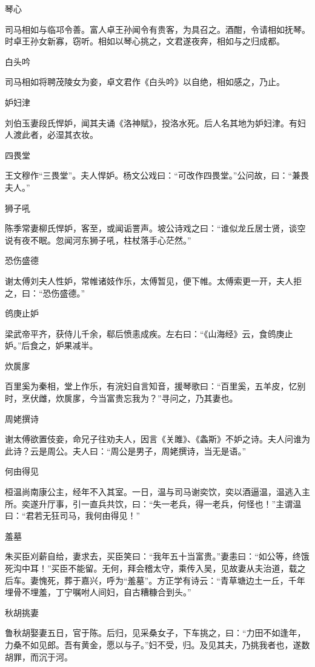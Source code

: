 \documentclass[a4paper,12pt,UTF8,twoside]{ctexbook}
\begin{document}
    琴心
    
    司马相如与临邛令善。富人卓王孙闻令有贵客，为具召之。酒酣，令请相如抚琴。时卓王孙女新寡，窃听。相如以琴心挑之，文君遂夜奔，相如与之归成都。
    
    白头吟
    
    司马相如将聘茂陵女为妾，卓文君作《白头吟》以自绝，相如感之，乃止。
    
    妒妇津
    
    刘伯玉妻段氏悍妒，闻其夫诵《洛神赋》，投洛水死。后人名其地为妒妇津。有妇人渡此者，必湿其衣妆。
    
    四畏堂
    
    王文穆作“三畏堂”。夫人悍妒。杨文公戏曰：“可改作四畏堂。”公问故，曰：“兼畏夫人。”
    
    狮子吼
    
    陈季常妻柳氏悍妒，客至，或闻诟詈声。坡公诗戏之曰：“谁似龙丘居士贤，谈空说有夜不眠。忽闻河东狮子吼，柱杖落手心茫然。”
    
    恐伤盛德
    
    谢太傅刘夫人性妒，常帷诸妓作乐，太傅暂见，便下帷。太傅索更一开，夫人拒之，曰：“恐伤盛德。”
    
    鸧庚止妒
    
    梁武帝平齐，获侍儿千余，郗后愤恚成疾。左右曰：“《山海经》云，食鸧庚止妒。”后食之，妒果减半。
    
    炊扊扅
    
    百里奚为秦相，堂上作乐，有浣妇自言知音，援琴歌曰：“百里奚，五羊皮，忆别时，烹伏雌，炊扊扅，今当富贵忘我为？”寻问之，乃其妻也。
    
    周姥撰诗
    
    谢太傅欲置伎妾，命兄子往劝夫人，因言《关雎》、《螽斯》不妒之诗。夫人问谁为此诗？云是周公。夫人曰：“周公是男子，周姥撰诗，当无是语。”
    
    何由得见
    
    桓温尚南康公主，经年不入其室。一日，温与司马谢奕饮，奕以酒逼温，温逃入主所。奕遂升厅事，引一直兵共饮，曰：“失一老兵，得一老兵，何怪也！”主谓温曰：“君若无狂司马，我何由得见！”
    
    羞墓
    
    朱买臣刈薪自给，妻求去，买臣笑曰：“我年五十当富贵。”妻恚曰：“如公等，终饿死沟中耳！”买臣不能留。无何，拜会稽太守，乘传入吴，见故妻从夫治道，载之后车。妻愧死，葬于嘉兴，呼为“羞墓”。方正学有诗云：“青草塘边土一丘，千年埋骨不埋羞，丁宁嘱咐人间妇，自古糟糠合到头。”
    
    秋胡挑妻
    
    鲁秋胡娶妻五日，官于陈。后归，见采桑女子，下车挑之，曰：“力田不如逢年，力桑不如见郎。吾有黄金，愿以与子。”妇不受，归。及见其夫，乃挑我者也，遂数胡罪，而沉于河。
    
\end{document}
